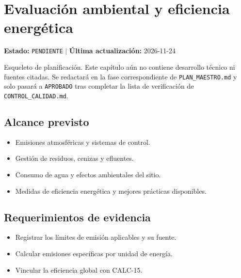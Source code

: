 \chapter{Evaluación ambiental y eficiencia energética}
\label{cap:14}

\begin{cajaestado}
\textbf{Estado:} \texttt{PENDIENTE} \quad$|$\quad
\textbf{Última actualización:} 2026-11-24

Esqueleto de planificación. Este capítulo aún no contiene desarrollo técnico ni
fuentes citadas. Se redactará en la fase correspondiente de
\texttt{PLAN\_MAESTRO.md} y solo pasará a \texttt{APROBADO} tras completar
la lista de verificación de \texttt{CONTROL\_CALIDAD.md}.
\end{cajaestado}

\section{Alcance previsto}
\begin{itemize}
  \item Emisiones atmosféricas y sistemas de control.
  \item Gestión de residuos, cenizas y efluentes.
  \item Consumo de agua y efectos ambientales del sitio.
  \item Medidas de eficiencia energética y mejores prácticas disponibles.
\end{itemize}

\section{Requerimientos de evidencia}
\begin{itemize}
  \item Registrar los límites de emisión aplicables y su fuente.
  \item Calcular emisiones específicas por unidad de energía.
  \item Vincular la eficiencia global con CALC-15.
\end{itemize}

